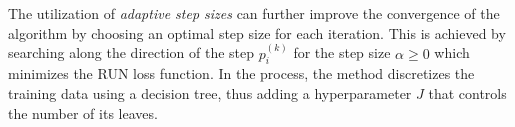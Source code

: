  \label{sec:dsea:dsea:step_size:adaptive}
The utilization of \emph{adaptive step sizes} \cite{dsea_mirko}
can further improve the convergence of the algorithm
  by choosing an optimal step size for each iteration. %
This is achieved by searching
  along the direction of the step $p_i^{(k)}$ %
  for the step size $\alpha \geq 0$
    which minimizes the \ac{RUN} \cite{milke2013} loss function.
In the process,
the method discretizes the training data
  using a decision tree,
  thus adding a hyperparameter $J$
    that controls the number of its leaves.
